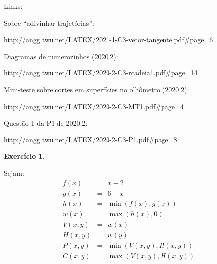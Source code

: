 \documentclass[oneside,12pt]{article}
\begin{document}
\newpage


Links:

\msk

Sobre ``adivinhar trajetórias'':

{\footnotesize

\url{http://angg.twu.net/LATEX/2021-1-C3-vetor-tangente.pdf\#page=6}

}

\msk

Diagramas de numerozinhos (2020.2):

{\footnotesize

\url{http://angg.twu.net/LATEX/2020-2-C3-rcadeia1.pdf\#page=14}

}

\msk

Mini-teste sobre cortes em superfícies no olhômetro (2020.2):

{\footnotesize

\url{http://angg.twu.net/LATEX/2020-2-C3-MT1.pdf\#page=4}

}


\msk

Questão 1 da P1 de 2020.2:

{\footnotesize

\url{http://angg.twu.net/LATEX/2020-2-C3-P1.pdf\#page=8}

}

\newpage


{\bf Exercício 1.}

Sejam:
%
$$\begin{array}{rcl}
  f(x) &=& x-2 \\
  g(x) &=& 6-x \\
  h(x) &=& \min(f(x), g(x)) \\
  w(x) &=& \max(h(x), 0) \\
  [5pt]
  V(x,y) &=& w(x) \\
  H(x,y) &=& w(y) \\
  P(x,y) &=& \min(V(x,y), H(x,y)) \\
  C(x,y) &=& \max(V(x,y), H(x,y)) \\
  \end{array}
$$
\end{document}
